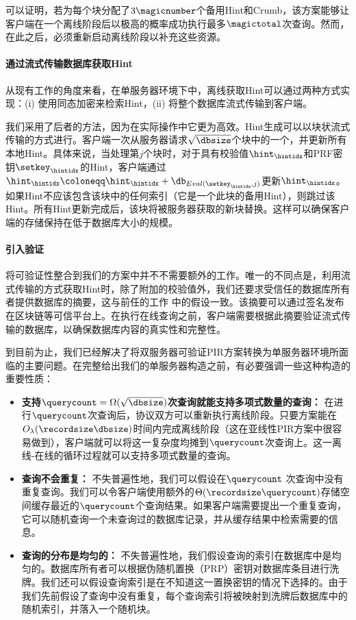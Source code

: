 可以证明，若为每个块分配了$3\magicnumber$个备用Hint和Crumb，该方案能够让客户端在一个离线阶段后以极高的概率成功执行最多$\magictotal$次查询。然而，在此之后，必须重新启动离线阶段以补充这些资源。

\paragraph{通过流式传输数据库获取Hint}
从现有工作的角度来看，在单服务器环境下中，离线获取Hint可以通过两种方式实现：(i)  使用同态加密来检索Hint\cite{EC:CorHenKog22}，(ii) 将整个数据库流式传输到客户端\cite{CCS:PatPerYeo18, Piano}。

我们采用了后者的方法，因为在实际操作中它更为高效。Hint生成可以以块状流式传输的方式进行。客户端一次从服务器请求$\sqrt{\dbsize}$个块中的一个，并更新所有本地Hint。具体来说，当处理第$j$个块时，对于具有校验值$\hint_\hintidx$和PRF密钥$\setkey_\hintidx$的Hint，客户端通过$\hint_\hintidx \coloneqq \hint_\hintidx+\db_{Eval(\setkey_\hintidx,j)}$更新$\hint_\hintidx$。如果Hint不应该包含该块中的任何索引（它是一个此块的备用Hint），则跳过该Hint。所有Hint更新完成后，该块将被服务器获取的新块替换。这样可以确保客户端的存储保持在低于数据库大小的规模。

\paragraph{引入验证}
将可验证性整合到我们的方案中并不不需要额外的工作。唯一的不同点是，利用流式传输的方式获取Hint时，除了附加的校验值外，我们还要求受信任的数据库所有者提供数据库的摘要，这与前任的工作 \cite{APIR23} 中的假设一致。该摘要可以通过签名发布在区块链等可信平台上。在执行在线查询之前，客户端需要根据此摘要验证流式传输的数据库，以确保数据库内容的真实性和完整性。

到目前为止，我们已经解决了将双服务器可验证PIR方案转换为单服务器环境所面临的主要问题。在完整给出我们的单服务器构造之前，有必要强调一些这种构造的重要性质：
\begin{itemize}
    \item \textbf{支持$\querycount = \Omega(\sqrt{\dbsize})$次查询就能支持多项式数量的查询：} 在进行$\querycount$次查询后，协议双方可以重新执行离线阶段。只要方案能在$O_\lambda(\recordsize\dbsize)$时间内完成离线阶段（这在亚线性PIR方案中很容易做到），客户端就可以将这一复杂度均摊到$\querycount$次查询上。这一离线-在线的循环过程就可以支持多项式数量的查询。

    \item \textbf{查询不会重复：} 不失普遍性地，我们可以假设在$\querycount$ 次查询中没有重复查询。我们可以令客户端使用额外的$\Theta(\recordsize \querycount)$存储空间缓存最近的$\querycount$个查询结果。如果客户端需要提出一个重复查询，它可以随机查询一个未查询过的数据库记录，并从缓存结果中检索需要的信息。

    \item \textbf{查询的分布是均匀的：} 不失普遍性地，我们假设查询的索引在数据库中是均匀的。数据库所有者可以根据伪随机置换（PRP）密钥对数据库条目进行洗牌。我们还可以假设查询索引是在不知道这一置换密钥的情况下选择的。由于我们先前假设了查询中没有重复，每个查询索引将被映射到洗牌后数据库中的随机索引，并落入一个随机块。
\end{itemize}

